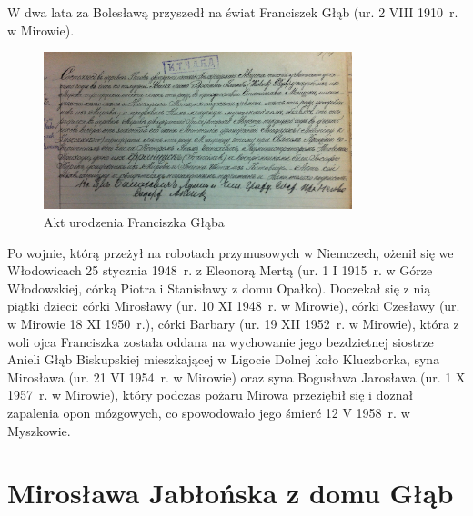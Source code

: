 W dwa lata za Bolesławą przyszedł na świat Franciszek Głąb (ur. 2 VIII 1910~r. w Mirowie).

\begin{figure}[!h]
\begin{center}
\includegraphics[width=0.8\textwidth]{zdjecia/akt_urodzenia_franciszka_glaba.jpg}
\caption{Akt urodzenia Franciszka Głąba}
\label{rys:akt_urodzenia_franciszka_glaba}
\end{center}
\end{figure}

Po wojnie, którą przeżył na robotach przymusowych w Niemczech, ożenił się we Włodowicach 25 stycznia 1948~r. z Eleonorą Mertą (ur. 1 I 1915~r. w Górze Włodowskiej, córką Piotra i Stanisławy z domu Opałko). Doczekał się z nią piątki dzieci: córki Mirosławy (ur. 10 XI 1948~r. w Mirowie), córki Czesławy (ur. w Mirowie 18 XI 1950~r.), córki Barbary (ur. 19 XII 1952~r. w Mirowie), która z woli ojca Franciszka została oddana na wychowanie jego bezdzietnej siostrze Anieli Głąb Biskupskiej mieszkającej w Ligocie Dolnej koło Kluczborka, syna Mirosława (ur. 21 VI 1954~r. w Mirowie) oraz syna Bogusława Jarosława (ur. 1 X 1957~r. w Mirowie), który podczas pożaru Mirowa przeziębił się i doznał zapalenia opon mózgowych, co spowodowało jego śmierć 12 V 1958~r. w Myszkowie.





\section{Mirosława Jabłońska z domu Głąb}
   

